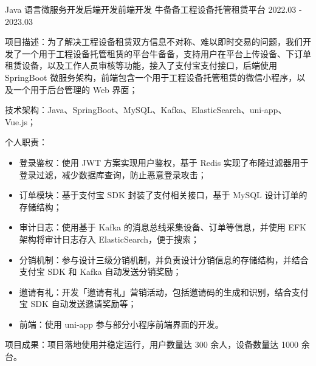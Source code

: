 \begin{cventries}
  \cventry
    {Java 语言微服务开发{\enskip\cdotp\enskip}后端开发{\enskip\cdotp\enskip}前端开发} %
    {牛备备工程设备托管租赁平台} %
    {2022.03 - 2023.03} %
    {} %
    {
      \begin{cvitems}
        \item {项目描述：为了解决工程设备租赁双方信息不对称、难以即时交易的问题，我们开发了一个用于工程设备托管租赁的平台牛备备，支持用户在平台上传设备、下订单租赁设备，以及工作人员审核等功能，接入了支付宝支付接口，后端使用 SpringBoot 微服务架构，前端包含一个用于工程设备托管租赁的微信小程序，以及一个用于后台管理的 Web 界面；}
        \item {技术架构：Java、SpringBoot、MySQL、Kafka、ElasticSearch、uni-app、Vue.js；}
        \item {个人职责：}
          \begin{itemize}
            \item {登录鉴权：使用 JWT 方案实现用户鉴权，基于 Redis 实现了布隆过滤器用于登录过滤，减少数据库查询，防止恶意登录攻击；}
            \item {订单模块：基于支付宝 SDK 封装了支付相关接口，基于 MySQL 设计订单的存储结构；}
            \item {审计日志：使用基于 Kafka 的消息总线采集设备、订单等信息，并使用 EFK 架构将审计日志存入 ElasticSearch，便于搜索；}
            \item {分销机制：参与设计三级分销机制，并负责设计分销信息的存储结构，并结合支付宝 SDK 和 Kafka 自动发送分销奖励；}
            \item {邀请有礼：开发「邀请有礼」营销活动，包括邀请码的生成和识别，结合支付宝 SDK 自动发送邀请奖励等；}
            \item {前端：使用 uni-app 参与部分小程序前端界面的开发。}
          \end{itemize}
        \item {项目成果：项目落地使用并稳定运行，用户数量达 300 余人，设备数量达 1000 余台。}
      \end{cvitems}
    }



\end{cventries}
